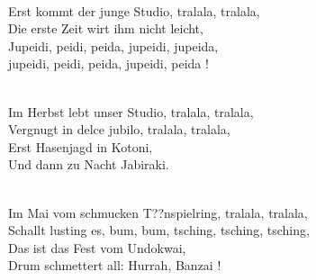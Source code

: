 \documentclass[10pt,b5j]{tarticle} %
\begin{document}
\vspace{1.5em} %
\newcommand{\linespace}{0.5em} %
\newcommand{\blocksize}{0.5\hsize} %
\newcommand{\itemmargin}{3em} %
\begin{enumerate} %
    \setlength{\itemindent}{\itemmargin} %
    \begin{minipage}[c]{\blocksize}
    
        \vspace{\linespace}
        \item~\\
        Erst kommt der junge Studio, tralala, tralala,\\
        Die erste Zeit wirt ihm nicht leicht,\\
            Jupeidi, peidi, peida, jupeidi, jupeida,\\
            jupeidi, peidi, peida, jupeidi, peida !
        
    \end{minipage}
    \begin{minipage}[c]{\blocksize}
        
        \vspace{\linespace}
        \item~\\
        Im Herbst lebt unser Studio, tralala, tralala,\\
        Vergnugt in delce jubilo, tralala, tralala,\\
        Erst Hasenjagd in Kotoni,\\
        Und dann zu Nacht Jabiraki.
        
    \end{minipage}
    \begin{minipage}[c]{\blocksize}
        
        \vspace{\linespace}
        \item~\\
        Im Mai vom schmucken T??nspielring, tralala, tralala,\\
        Schallt lusting es, bum, bum, tsching, tsching, tsching,\\
        Das ist das Fest vom Undokwai,\\
        Drum schmettert all: Hurrah, Banzai !
        

\end{minipage}
\end{enumerate}
\end{document}
